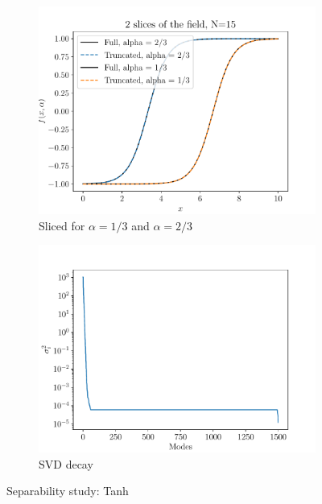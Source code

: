 \begin{figure}
\begin{subfigure}[t]{0.5\linewidth}
    \includegraphics[width=\linewidth]{Figures/Sliced_TruncatedField_15_Tanh.pdf}
    \caption{Sliced for $\alpha = 1/3$ and $\alpha = 2/3$}
\end{subfigure} 
  \begin{subfigure}[t]{0.5\linewidth}
    \centering
    \includegraphics[width=\linewidth]{Figures/SVD_Decay_Tanh.pdf}
    \caption{SVD decay}
\end{subfigure} 
\caption{Separability study: Tanh}
    \label{Separability_Tanh}
\end{figure}

